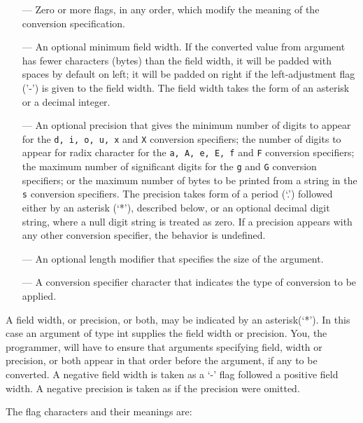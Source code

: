 \begin{itemize}
\item[---] Zero or more flags, in any order, which modify the meaning of the
  conversion specification. 
\item[---] An optional minimum field width. If the converted value from argument has
  fewer characters (bytes) than the field width, it will be padded with spaces
  by default on left; it will be padded on right if the left-adjustment flag
  ('-') is given to the field width. The field width takes the form of an
  asterisk or a decimal integer. 
\item[---] An optional precision that gives the minimum number of digits to appear
  for the \texttt{d, i, o, u, x} and \texttt{X} conversion specifiers; the
  number of digits to appear for radix character for the \texttt{a, A, e, E, f}
  and \texttt{F} conversion specifiers; the maximum number of significant
  digits for the \texttt{g} and \texttt{G} conversion specifiers; or the
  maximum number of bytes to be printed from a string in the \texttt{s}
  conversion specifiers. The precision takes form of a period (`.') followed
  either by an asterisk (`*'), described below, or an optional decimal digit
  string, where a null digit string is treated as zero. If a precision appears
  with any other conversion specifier, the behavior is undefined.
\item[---] An optional length modifier that specifies the size of the argument.
\item[---] A conversion specifier character that indicates the type of conversion
  to be applied. 
\end{itemize}

A field width, or precision, or both, may be indicated by an asterisk(`*'). In
this case an argument of type int supplies the field width or precision. You,
the programmer, will have to ensure that arguments specifying field, width or
precision, or both appear in that order before the argument, if any to be
converted. A negative field width is taken as a `-' flag followed a positive
field width. A negative precision is taken as if the precision were omitted.

The flag characters and their meanings are:

